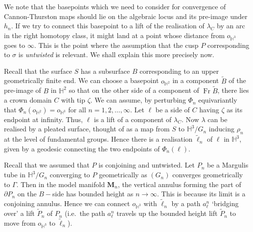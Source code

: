 \documentclass{amsart}
\theoremstyle{definition}
\newcommand{\Fr}{\operatorname{Fr}}
\newcommand\HHH{{\mathbb H}}
\begin{document}
 
We note that the basepoints which we need to consider for convergence of  Cannon-Thurston maps should lie on the algebraic locus and its pre-image under $h_n$.
If we try to connect this basepoint to a lift of the realisation of $\lambda_C$ by an arc in the right homotopy class, it might land at a point whose distance from $o_{\HHH^3}$ goes to $\infty$.
This is the point where the assumption that the cusp $P$ corresponding to $ \sigma$ is {\em untwisted} is relevant.
We shall explain this more precisely now.

Recall that the surface $S$ has a subsurface $B$ corresponding to an upper geometrically finite end.
We can choose a basepoint $o_{\HHH^2}$ in a component $\tilde B$ of the pre-image of $B$ in $\HHH^2$ so that on the other side of a component of $\Fr \widetilde B$, there lies a crown domain $C$ with tip $\zeta$.
We can assume, by perturbing $\Phi_n$ equivariantly that $\Phi_n(o_{\HHH^2}) = o_{\HHH^3}$ for all $n=1, 2, \dots, \infty$.
Let $\ell$ be a side of $C$ having $\zeta$ as its endpoint at infinity. Thus, $\ell$ is a lift of a component of $\lambda_C$.
Now $\lambda$ can be realised by a pleated surface, thought of as a map  from $S$ to $\HHH^3/G_n$ inducing $\rho_n$ at the level of  fundamental groups. Hence there is a realisation $\tilde \ell_n$ of $\ell$ in $\HHH^3$, given by a geodesic connecting the two endpoints of $\Phi_n(\ell)$.

Recall that we assumed that  $P$ is conjoining and  untwisted.
Let $P_n$ be a Margulis tube in $\HHH^3/G_n$ converging to $P$ geometrically as $(G_n)$ converges geometrically to $\Gamma$.
Then in the model manifold $\mathbf M_n$, the vertical annulus  forming the part of $\partial P_n$ on the $B-$side  has bounded height as $n \rightarrow \infty$. This is because  its limit is a conjoining annulus.
Hence we can connect $o_{\HHH^3}$ with $\tilde \ell_n$ by a path $a^n_\ell$ \lq bridging over' a lift $\widetilde P_n$ of $P_n$ (i.e.\ the path $a^n_\ell$ travels up the bounded height lift $\widetilde P_n$ to move from $o_{\HHH^3}$ to $\tilde \ell_n$).
\end{document}
